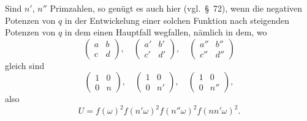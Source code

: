 \documentclass[12pt,a4paper]{article}
\theoremstyle{definition}
\begin{document}
Sind $n'$, $n''$ Primzahlen, so genügt es auch hier (vgl.\ \S\ 72), wenn die negativen Potenzen von $q$ in der Entwickelung einer solchen Funktion nach steigenden Potenzen von $q$ in dem einen Hauptfall wegfallen, nämlich in dem, wo
\[
\begin{pmatrix} a & b \\ c & d \end{pmatrix}, \quad \begin{pmatrix} a' & b' \\ c' & d' \end{pmatrix}, \quad \begin{pmatrix} a'' & b'' \\ c'' & d'' \end{pmatrix}
\]
gleich sind
\[
\begin{pmatrix} 1 & 0 \\ 0 & n \end{pmatrix}, \quad \begin{pmatrix} 1 & 0 \\ 0 & n' \end{pmatrix}, \quad \begin{pmatrix} 1 & 0 \\ 0 & n'' \end{pmatrix},
\]
also
\[
U = f(\omega)^2 f(n'\omega)^2 f(n''\omega)^2 f(nn'\omega)^2.
\]
\end{document}
